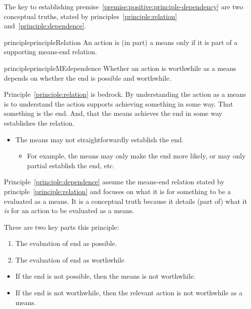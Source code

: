 \documentclass[10pt]{article}
\newcommand{\hozlinedash}[0]{%
  \noindent\hdashrule[0.5ex][c]{\textwidth}{.1pt}{2.5pt}
}
\begin{document}

\hozlinedash

The key to establishing premise~\ref{premise:positive:principle-dependency} are two conceptual truths, stated by principles~\ref{principle:relation} and~\ref{principle:dependence}.

\begin{restatable}{principle}{principleRelation}\label{principle:relation}
  An action is (in part) a means only if it is part of a supporting means-end relation.
\end{restatable}

\begin{restatable}{principle}{principleMEdependence}\label{principle:dependence}
  Whether an action is worthwhile as a means depends on whether the end is possible and worthwhile.
\end{restatable}


Principle~\ref{principle:relation} is bedrock.
By understanding the action as a means is to understand the action supports achieving something in some way.
That something is the end.
And, that the means achieves the end in some way establishes the relation.
\begin{itemize}[noitemsep]
\item The means may not straightforwardly establish the end.
  \begin{itemize}[noitemsep]
  \item For example, the means may only make the end more likely, or may only partial establish the end, etc.
  \end{itemize}
\end{itemize}

Principle~\ref{principle:dependence} assume the means-end relation stated by principle~\ref{principle:relation} and focuses on what it is for something to be a evaluated as a means.
It is a conceptual truth because it details (part of) what it \emph{is} for an action to be evaluated as a means.

Three are two key parts this principle:
\begin{enumerate}
\item The evaluation of end as possible.
\item The evaluation of end as worthwhile
\end{enumerate}

\begin{itemize}
\item If the end is not possible, then the means is not worthwhile.
\item If the end is not worthwhile, then the relevant action is not worthwhile as a means.
\end{itemize}
\end{document}
